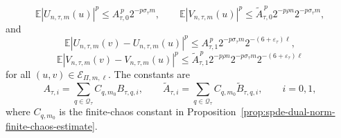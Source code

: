 \begin{proposition}
\[
  \mathbb E|U_{n,\tau,m}(u)|^p
  \leq
  A_{\tau,0}^{\,p}2^{-p\sigma_\tau m},
  \qquad
  \mathbb E|V_{n,\tau,m}(u)|^p
  \leq
  \widetilde A_{\tau,0}^{\,p}2^{-p\rho n}2^{-p\sigma_\tau m},
\]
and
\[
  \mathbb E|U_{n,\tau,m}(v)-U_{n,\tau,m}(u)|^p
  \leq
  A_{\tau,1}^{\,p}2^{-p\sigma_\tau m}2^{-(6+\varepsilon_\tau)\ell},
\]
\[
  \mathbb E|V_{n,\tau,m}(v)-V_{n,\tau,m}(u)|^p
  \leq
  \widetilde A_{\tau,1}^{\,p}2^{-p\rho n}2^{-p\sigma_\tau m}
  2^{-(6+\varepsilon_\tau)\ell}
\]
for all \((u,v)\in\mathcal E_{\Pi,m,\ell}\).  The constants are
\begin{equation}
  A_{\tau,i}=
  \sum_{q\in\mathcal Q_\tau}C_{q,m_0}B_{\tau,q,i},
  \qquad
  \widetilde A_{\tau,i}=
  \sum_{q\in\mathcal Q_\tau}C_{q,m_0}\widetilde B_{\tau,q,i},
  \qquad i=0,1,
  \label{eq:spde-nonlinear-pi-coordinate-moment-constants}
\end{equation}
where \(C_{q,m_0}\) is the finite-chaos constant in
Proposition~\ref{prop:spde-dual-norm-finite-chaos-estimate}.
\end{proposition}

